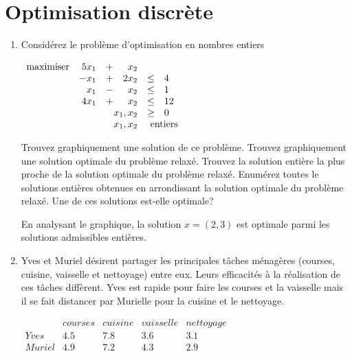 \section{Optimisation discrète}

\begin{enumerate}

  \item Considérez le problème d'optimisation en nombres entiers

    $
    \begin{array}{lrcrcl}
      \maxi & 5x_1 & +&  x_2\\
      & -x_1 &+& 2 x_2  & \leq & 4 \\
      & x_1    & - &    x_2   &  \leq & 1\\
      &   4x_1& +&  x_2  & \leq & 12 \\
      &   \multicolumn{3}{r}{x_1, x_2}  & \geq & 0\\
      &   \multicolumn{3}{r}{x_1, x_2}  & \multicolumn{2}{l}{\mbox{ entiers}}
    \end{array}
    $

    Trouvez graphiquement une solution de ce problème. Trouvez graphiquement une solution optimale du problème relaxé. Trouvez la
    solution entière la plus proche de la solution optimale du problème relaxé. Enumérez toutes le solutions entières obtenues en
    arrondissant la solution optimale du problème relaxé. Une de ces solutions est-elle optimale?


    \begin{solution}
      En analysant le graphique, la solution $x = (2,3)$ est optimale parmi les solutions admissibles entières.
    \end{solution}

  \item Yves et Muriel désirent partager les principales tâches ménagères  (courses, cuisine, vaisselle et nettoyage)
    entre eux. Leurs efficacités à la réalisation de ces tâches
    diffèrent. Yves est rapide pour faire les courses et la vaisselle mais il se fait distancer par Murielle pour la cuisine et le
    nettoyage.

    $
    \begin{array}{l|llll}
      & courses & cuisine & vaisselle & nettoyage\\
      \hline
      Yves & 4.5 & 7.8 & 3.6 & 3.1\\
      Muriel & 4.9 & 7.2 & 4.3 & 2.9
    \end{array}
    $


\end{enumerate}
